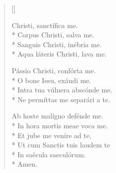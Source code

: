 \newHymn
{}
\settowidth{\versewidth}{Anima Christi, sanctifica me}

\begin{verse}[\versewidth]

 Christi, sanctífica me.\\*
Corpus Christi, salva me.\\*
Sanguis Christi, inébria me.\\*
Aqua láteris Christi, lava me.
\pointtrans

Pássio Christi, confórta me.\\*
O bone Iesu, exáudi me.\\*
Intra tua vúlnera abscónde me.\\*
Ne permíttas me separári a te.

Ab hoste malígno defénde me.\\*
In hora mortis meae voca me.\\*
Et jube me veníre ad te,\\*
Ut cum Sanctis tuis laudem te\\*
In saécula saeculórum.\\*
Amen.

\end{verse}






